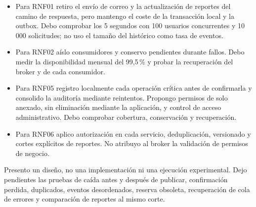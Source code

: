 \begin{itemize}
\item Para RNF01 retiro el envío de correo y la actualización de reportes
del camino de respuesta, pero mantengo el coste de la transacción local
y la outbox. Debo comprobar los 5 segundos con 100 usuarios concurrentes
y 10\,000 solicitudes; no uso el tamaño del histórico como tasa de eventos.
\item Para RNF02 aíslo consumidores y conservo pendientes durante fallos.
Debo medir la disponibilidad mensual del 99,5\,\% y probar la recuperación
del broker y de cada consumidor.
\item Para RNF05 registro localmente cada operación crítica antes de
confirmarla y consolido la auditoría mediante reintentos. Propongo permisos
de solo anexado, sin eliminación mediante la aplicación, y control de
acceso administrativo. Debo comprobar cobertura, conservación y recuperación.
\item Para RNF06 aplico autorización en cada servicio, deduplicación,
versionado y cortes explícitos de reportes. No atribuyo al broker la
validación de permisos de negocio.
\end{itemize}

Presento un diseño, no una implementación ni una ejecución experimental.
Dejo pendientes las pruebas de caída antes y después de publicar,
confirmación perdida, duplicados, eventos desordenados, reserva obsoleta,
recuperación de cola de errores y comparación de reportes al mismo corte.

